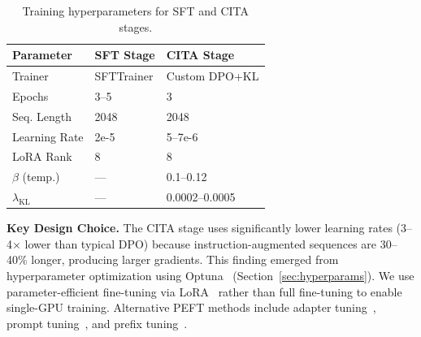 \begin{table}[H]
\centering
\footnotesize
\begin{tabularx}{\columnwidth}{@{}lXX@{}}
\toprule
\textbf{Parameter} & \textbf{SFT Stage} & \textbf{CITA Stage} \\
\midrule
Trainer & SFTTrainer & Custom DPO+KL \\
Epochs & 3--5 & 3 \\
Seq. Length & 2048 & 2048 \\
Learning Rate & 2e-5 & 5--7e-6 \\
LoRA Rank & 8 & 8 \\
$\beta$ (temp.) & --- & 0.1--0.12 \\
$\lambda_{\text{KL}}$ & --- & 0.0002--0.0005 \\
\bottomrule
\end{tabularx}
\caption{Training hyperparameters for SFT and CITA stages.}
\label{tab:training_config}
\vspace{-4mm}
\end{table}

\textbf{Key Design Choice.} The CITA stage uses significantly lower learning rates (3--4$\times$ lower than typical DPO) because instruction-augmented sequences are 30--40\% longer, producing larger gradients. This finding emerged from hyperparameter optimization using Optuna~\cite{akiba2019optuna} (Section~\ref{sec:hyperparams}). We use parameter-efficient fine-tuning via LoRA~\cite{hu2022lora,dettmers2023qlora} rather than full fine-tuning to enable single-GPU training. Alternative PEFT methods include adapter tuning~\cite{houlsby2019parameter}, prompt tuning~\cite{lester2021power}, and prefix tuning~\cite{li2021prefix}.

